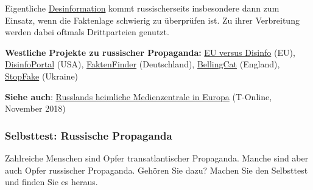 Eigentliche
\href{https://www.wilsoncenter.org/blog-post/operation-denver-kgb-and-stasi-disinformation-regarding-aids}{Desinformation}
kommt russischerseits insbesondere dann zum Einsatz, wenn die
Fakten­lage schwierig zu überprüfen ist. Zu ihrer Verbreitung werden
dabei oftmals Drittparteien genutzt.

\textbf{Westliche Projekte zu russischer Propaganda:}
\href{https://euvsdisinfo.eu/}{EU versus Dis­info} (EU),
\href{https://disinfoportal.org/}{DisinfoPortal} (USA),
\href{https://faktenfinder.tagesschau.de/ausland/index.html}{FaktenFinder}
(Deutschland), \href{https://www.bellingcat.com/}{BellingCat} (England),
\href{https://www.stopfake.org/en/news/}{StopFake} (Ukraine)

\textbf{Siehe auch}:
\href{https://www.t-online.de/nachrichten/deutschland/id_84584050/mitten-in-berlin-russlands-heimliche-medienzentrale-in-europa.html}{Russlands
heimliche Medienzentrale in Europa} (T-Online, November 2018)

\hypertarget{selbsttest-russische-propaganda}{%
\subsubsection{Selbsttest: Russische
Propaganda}\label{selbsttest-russische-propaganda}}

Zahlreiche Menschen sind Opfer transatlantischer Propaganda. Manche sind
aber auch Opfer russischer Propaganda. Gehören Sie dazu? Machen Sie den
Selbsttest und finden Sie es heraus.

